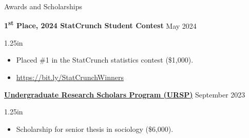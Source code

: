 \documentclass[
	12pt, %
]{resume} %
\newcommand{\righthandindent}{1.25in}
\begin{document}
\begin{rSection}{Awards and Scholarships}

\textbf{1\textsuperscript{st} Place, 2024 StatCrunch Student Contest} \hfill May 2024
\begin{adjustwidth}{0pt}{\righthandindent}
\vspace{-7pt}
\begin{itemize}
    \item[] Placed \#1 in the StatCrunch statistics contest (\$\thinspace{}1,000).
    \vspace{-7pt}
    \item[] \href{https://bit.ly/StatCrunchWinners}{https://bit.ly/StatCrunchWinners}
\end{itemize}
\end{adjustwidth}





\href{https://hass.ugresearch.ucla.edu/scholarships/ursp/students/}{\textbf{Undergraduate Research Scholars Program (URSP)}} \hfill September 2023
\begin{adjustwidth}{0pt}{\righthandindent}
\vspace{-7pt}
\begin{itemize}
    \item[] Scholarship for senior thesis in sociology (\$\thinspace{}6,000).
\end{itemize}
\end{adjustwidth}


\end{rSection}
\end{document}
